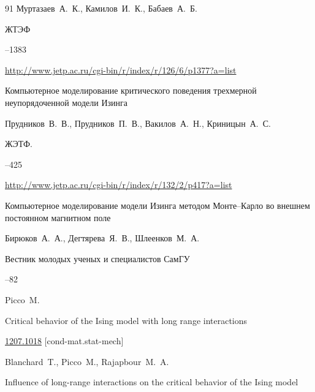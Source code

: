 \begin{thebibliography}{91}
\by Муртазаев~А.~К., Камилов~И.~К., Бабаев~А.~Б.

\jour ЖТЭФ




--1383

\elink \url{http://www.jetp.ac.ru/cgi-bin/r/index/r/126/6/p1377?a=list}




\paper Компьютерное моделирование критического поведения трехмерной неупорядоченной модели Изинга

\by    Прудников~В.~В., Прудников~П.~В., Вакилов~А.~Н., Криницын~А.~С.

\jour ЖЭТФ.



--425

\elink \url{http://www.jetp.ac.ru/cgi-bin/r/index/r/132/2/p417?a=list}




\paper  Компьютерное моделирование модели Изинга методом Монте--Карло во внешнем постоянном магнитном поле

\by Бирюков~А.~А., Дегтярева~Я.~В., Шлеенков~М.~А.

\jour Вестник молодых ученых и специалистов СамГУ



--82





\by Picco~M.

\preprint Critical behavior of the Ising model with long range interactions

\arxiv \href{http://arxiv.org/abs/1207.1018}{1207.1018} [cond-mat.stat-mech]






\by Blanchard~T., Picco~M., Rajapbour~M.~A.

\paper  Influence of long-range interactions on the critical behavior of the Ising model


\end{thebibliography}
